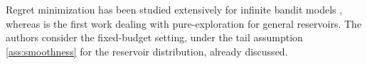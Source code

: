 Regret minimization has been studied
extensively for infinite bandit models
\citep{berry1997,NIPS2008_3452, NIPS2013_5109,
10.1007/978-3-662-44848-9_20}, whereas
\cite{DBLP:journals/corr/CarpentierV15} is the first work dealing with
pure-exploration for general reservoirs. The authors consider the fixed-budget
setting, under the tail
assumption \eqref{ass:smoothness} for the reservoir distribution,
already discussed.


